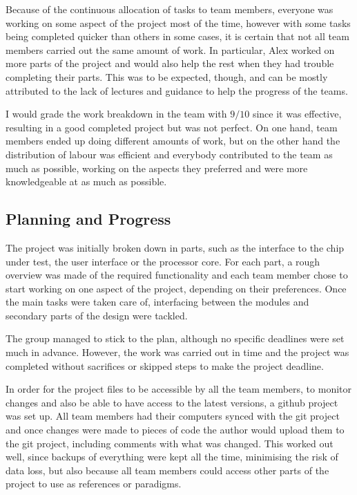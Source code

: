 Because of the continuous allocation of tasks to team members, everyone was working on some aspect of the project most of the time, however with some tasks being completed quicker than others in some cases, it is certain that not all team members carried out the same amount of work. In particular, Alex worked on more parts of the project and would also help the rest when they had trouble completing their parts. This was to be expected, though, and can be mostly attributed to the lack of lectures and guidance to help the progress of the teams.

I would grade the work breakdown in the team with $9/10$ since it was effective, resulting in a good completed project but was not perfect. On one hand, team members ended up doing different amounts of work, but on the other hand the distribution of labour was efficient and everybody contributed to the team as much as possible, working on the aspects they preferred and were more knowledgeable at as much as possible.




\subsection{Planning and Progress}
\label{sec:planning}

%

The project was initially broken down in parts, such as the interface to the chip under test, the user interface or the processor core. For each part, a rough overview was made of the required functionality and each team member chose to start working on one aspect of the project, depending on their preferences. Once the main tasks were taken care of, interfacing between the modules and secondary parts of the design were tackled.

The group managed to stick to the plan, although no specific deadlines were set much in advance. However, the work was carried out in time and the project was completed without sacrifices or skipped steps to make the project deadline.

In order for the project files to be accessible by all the team members, to monitor changes and also be able to have access to the latest versions, a github project was set up. All team members had their computers synced with the git project and once changes were made to pieces of code the author would upload them to the git project, including comments with what was changed. This worked out well, since backups of everything were kept all the time, minimising the risk of data loss, but also because all team members could access other parts of the project to use as references or paradigms.

